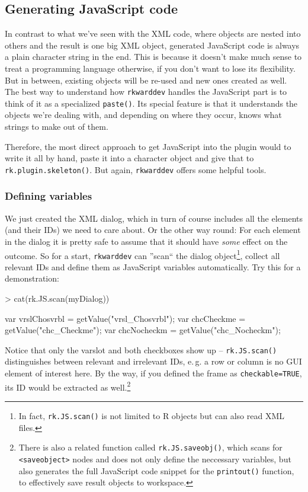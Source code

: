 \documentclass[a4paper,10pt]{scrartcl}
\begin{document}
\subsection{Generating JavaScript code}
In contrast to what we've seen with the XML code, where objects are nested into others and the result is one big XML object, generated JavaScript code
is always a plain character string in the end. This is because it doesn't make much sense to treat a programming language otherwise, if you don't want
to lose its flexibility. But in between, existing objects will be re-used and new ones created as well. The best way to understand how \texttt{rkwarddev}
handles the JavaScript part is to think of it as a specialized \texttt{paste()}. Its special feature is that it understands the objects we're dealing
with, and depending on where they occur, knows what strings to make out of them.

Therefore, the most direct approach to get JavaScript into the plugin would to write it all by hand, paste it into a character object and give that to
\texttt{rk.plugin.skeleton()}. But again, \texttt{rkwarddev} offers some helpful tools.

\subsubsection{Defining variables}
We just created the XML dialog, which in turn of course includes all the elements (and their IDs) we need to care about. Or the other way round:
For each element in the dialog it is pretty safe to assume that it should have \textit{some} effect on the outcome. So for a start, \texttt{rkwarddev}
can ''scan`` the dialog object\footnote{In fact, \texttt{rk.JS.scan()} is not limited to R objects but can also read XML files.},
collect all relevant IDs and define them as JavaScript variables automatically. Try this for a demonstration:

	\begin{Schunk}
		\begin{Sinput}
> cat(rk.JS.scan(myDialog))
		\end{Sinput}
		\begin{Soutput}
  var vrslChosvrbl = getValue("vrsl_Chosvrbl");
  var chcCheckme = getValue("chc_Checkme");
  var chcNocheckm = getValue("chc_Nocheckm");
		\end{Soutput}
	\end{Schunk}

Notice that only the varslot and both checkboxes show up -- \texttt{rk.JS.scan()} distinguishes between relevant and irrelevant IDs, e.\,g. a
row or column is no GUI element of interest here. By the way, if you defined the frame as \texttt{checkable=TRUE}, its ID would be
extracted as well.\footnote{There is also a related function called \texttt{rk.JS.saveobj()}, which scans for \texttt{<saveobject>} nodes and
does not only define the neccessary variables, but also generates the full JavaScript code snippet for the \texttt{printout()} function,
to effectively save result objects to workspace.}
\end{document}
